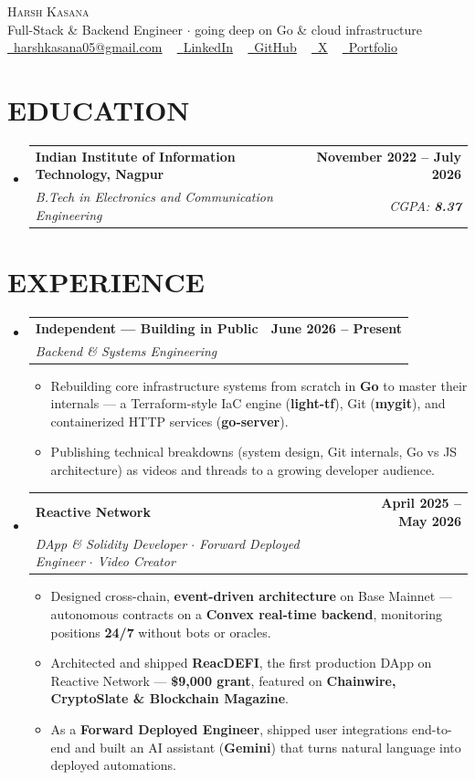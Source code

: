 \documentclass[letterpaper,10pt]{article}
\makeatletter
\newcommand{\resumeItem}[1]{
  \item\small{
    {#1 \vspace{-2pt}}
  }
}
\newcommand{\resumeSubheading}[4]{
  \vspace{-2pt}\item
    \begin{tabular*}{1.0\textwidth}[t]{l@{\extracolsep{\fill}}r}
      \textbf{#1} & \textbf{#2} \\
      \textit{#3} & \textit{#4} \\
    \end{tabular*}\vspace{-6pt}
}
\newcommand{\resumeSubHeadingListStart}{\begin{itemize}[leftmargin=0.0in, label={}]}
\newcommand{\resumeSubHeadingListEnd}{\end{itemize}}
\newcommand{\resumeItemListStart}{\begin{itemize}}
\newcommand{\resumeItemListEnd}{\end{itemize}\vspace{-4pt}}
\makeatother
\begin{document}
\begin{center}
    {\Huge \scshape Harsh Kasana} \\ \vspace{2pt}
    \footnotesize Full-Stack \& Backend Engineer $\cdot$ going deep on Go \& cloud infrastructure \\ \vspace{4pt}
    \small
    \href{mailto:harshkasana05@gmail.com}{\raisebox{-0.2\height}\faEnvelope\ \underline{harshkasana05@gmail.com}} ~
    \href{https://www.linkedin.com/in/harsh-kasana-8b6a79258/}{\raisebox{-0.2\height}\faLinkedin\ \underline{LinkedIn}} ~
    \href{https://github.com/harshkas4na}{\raisebox{-0.2\height}\faGithub\ \underline{GitHub}} ~
    \href{https://x.com/0xkasana}{\raisebox{-0.2\height}\faTwitter\ \underline{X}} ~
    \href{https://harshkasana.dev/}{\raisebox{-0.2\height}\faGlobe\ \underline{Portfolio}}
\end{center}

\section{EDUCATION}
  \resumeSubHeadingListStart
    \resumeSubheading
      {\textbf{Indian Institute of Information Technology, Nagpur}}{November 2022 -- July 2026}
      {\textit{B.Tech in Electronics and Communication Engineering}}{CGPA: \textbf{8.37}}
  \resumeSubHeadingListEnd

\section{EXPERIENCE}
  \resumeSubHeadingListStart
    \resumeSubheading
      {\textbf{Independent --- Building in Public}}{June 2026 -- Present}
      {\textit{Backend \& Systems Engineering}}{}
      \resumeItemListStart
        \resumeItem{Rebuilding core infrastructure systems from scratch in \textbf{Go} to master their internals --- a Terraform-style IaC engine (\textbf{light-tf}), Git (\textbf{mygit}), and containerized HTTP services (\textbf{go-server}).}
        \resumeItem{Publishing technical breakdowns (system design, Git internals, Go vs JS architecture) as videos and threads to a growing developer audience.}
      \resumeItemListEnd

    \resumeSubheading
      {\textbf{Reactive Network}}{April 2025 -- May 2026}
      {\textit{DApp \& Solidity Developer $\cdot$ Forward Deployed Engineer $\cdot$ Video Creator}}{}
      \resumeItemListStart
        \resumeItem{Designed cross-chain, \textbf{event-driven architecture} on Base Mainnet --- autonomous contracts on a \textbf{Convex real-time backend}, monitoring positions \textbf{24/7} without bots or oracles.}
        \resumeItem{Architected and shipped \textbf{ReacDEFI}, the first production DApp on Reactive Network --- \textbf{\$9,000 grant}, featured on \textbf{Chainwire, CryptoSlate \& Blockchain Magazine}.}
        \resumeItem{As a \textbf{Forward Deployed Engineer}, shipped user integrations end-to-end and built an AI assistant (\textbf{Gemini}) that turns natural language into deployed automations.}
      \resumeItemListEnd
  \resumeSubHeadingListEnd
\end{document}
